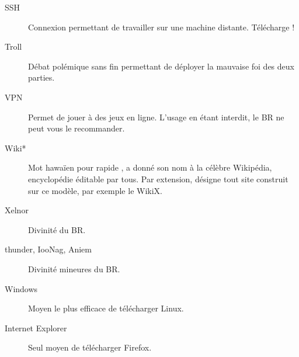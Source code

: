 \begin{description}
  \item[SSH] Connexion permettant de travailler sur une machine distante. Télécharge  !
  
  \item[Troll] Débat polémique sans fin permettant de déployer la mauvaise foi des deux parties.
  \item[VPN] Permet de jouer à des jeux en ligne. L'usage en étant interdit, le BR ne peut vous le recommander.
  
  
  \item[Wiki*] Mot hawa\"ien pour \og rapide \fg, a donné son nom à la célèbre Wikipédia, encyclopédie éditable par tous.
  Par extension, désigne tout site construit sur ce modèle, par exemple le WikiX.%
  
  \item[Xelnor] Divinité du BR.
  
  \item[thunder, IooNag, Aniem] Divinité mineures du BR.
  
  \item[Windows] Moyen le plus efficace de télécharger Linux.
  
  \item[Internet Explorer] Seul moyen de télécharger Firefox.
  
\end{description}
